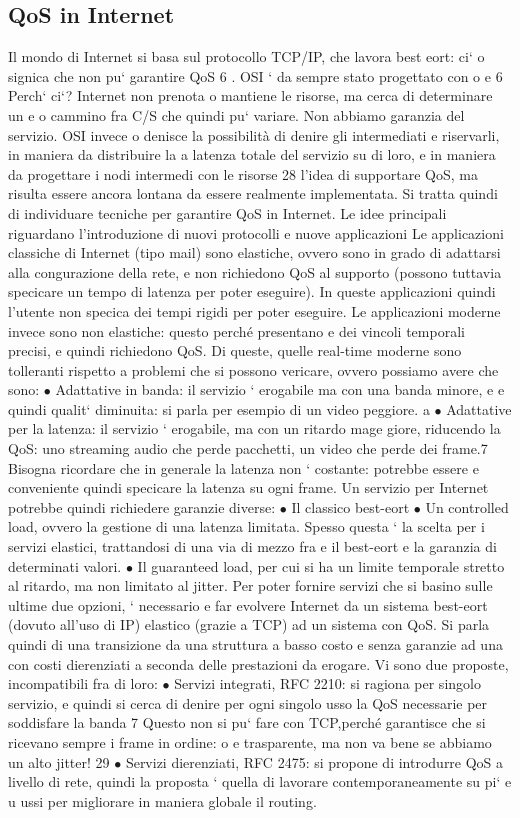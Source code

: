 \documentclass[a4paper,12pt]{article}
\begin{document}
\subsection{QoS in Internet}
Il mondo di Internet si basa sul protocollo TCP/IP, che lavora best eort: ci`
o
signica che non pu` garantire QoS 6 . OSI ` da sempre stato progettato con
o
e
6 Perch` ci`? Internet non prenota o mantiene le risorse, ma cerca di determinare un
e o
cammino fra C/S che quindi pu` variare. Non abbiamo garanzia del servizio. OSI invece
o
denisce la possibilità di denire gli intermediati e riservarli, in maniera da distribuire la
a
latenza totale del servizio su di loro, e in maniera da progettare i nodi intermedi con le risorse
28
l'idea di supportare QoS, ma risulta essere ancora lontana da essere realmente
implementata. Si tratta quindi di individuare tecniche per garantire QoS in Internet. Le idee principali riguardano
l'introduzione di nuovi protocolli e nuove
applicazioni
Le applicazioni classiche di Internet (tipo mail) sono elastiche, ovvero sono
in grado di adattarsi alla congurazione della rete, e non richiedono QoS al
supporto (possono tuttavia specicare un tempo di latenza per poter eseguire).
In queste applicazioni quindi l'utente non specica dei tempi rigidi per poter
eseguire.
Le applicazioni moderne invece sono non elastiche: questo perché presentano
e
dei vincoli temporali precisi, e quindi richiedono QoS. Di queste, quelle real-time
moderne sono tolleranti rispetto a problemi che si possono vericare, ovvero
possiamo avere che sono:
$\bullet$ Adattative in banda: il servizio ` erogabile ma con una banda minore, e
e
quindi qualit` diminuita: si parla per esempio di un video peggiore.
a
$\bullet$ Adattative per la latenza: il servizio ` erogabile, ma con un ritardo mage
giore, riducendo la QoS: uno streaming audio che perde pacchetti, un video
che perde dei frame.7
Bisogna ricordare che in generale la latenza non ` costante: potrebbe essere
e
conveniente quindi specicare la latenza su ogni frame.
Un servizio per Internet potrebbe quindi richiedere garanzie diverse:
$\bullet$ Il classico best-eort
$\bullet$ Un controlled load, ovvero la gestione di una latenza limitata. Spesso
questa ` la scelta per i servizi elastici, trattandosi di una via di mezzo fra
e
il best-eort e la garanzia di determinati valori.
$\bullet$ Il guaranteed load, per cui si ha un limite temporale stretto al ritardo, ma
non limitato al jitter.
Per poter fornire servizi che si basino sulle ultime due opzioni, ` necessario
e
far evolvere Internet da un sistema best-eort (dovuto all'uso di IP) elastico
(grazie a TCP) ad un sistema con QoS. Si parla quindi di una transizione da
una struttura a basso costo e senza garanzie ad una con costi dierenziati a
seconda delle prestazioni da erogare. Vi sono due proposte, incompatibili fra di
loro:
$\bullet$ Servizi integrati, RFC 2210: si ragiona per singolo servizio, e quindi si
cerca di denire per ogni singolo usso la QoS
necessarie per soddisfare la banda
7 Questo non si pu` fare con TCP,perché garantisce che si ricevano sempre i frame in ordine:
o
e
trasparente, ma non va bene se abbiamo un alto jitter!
29
$\bullet$ Servizi dierenziati, RFC 2475: si propone di introdurre QoS a livello di
rete, quindi la proposta ` quella di lavorare contemporaneamente su pi`
e
u
ussi per migliorare in maniera globale il routing.
\end{document}
